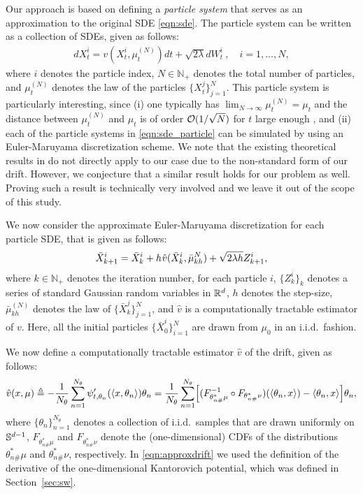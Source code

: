 Our approach is based on defining a \emph{particle system} that serves as an approximation to the original SDE \eqref{eqn:sde}. The particle system can be written as a collection of SDEs, given as follows:
\begin{align}
d X_t^i = v(X_t^i, \mu_t^{(N)}) dt + \sqrt{2 \lambda } d W_t^i \> , \quad i = 1,\dots, N, \label{eqn:sde_particle}
\end{align}
where $i$ denotes the particle index, $N \in \mathbb{N}_+$ denotes the total number of particles, and $\mu_t^{(N)}$ denotes the law of the particles $\{X_t^j\}_{j=1}^N$. This particle system is particularly interesting, since (i) one typically has $\lim_{N \rightarrow \infty} \mu_t^{(N)}= \mu_t $ and the distance between $\mu_t^{(N)}$ and $\mu_t$ is of order ${\cal O}(1/\sqrt{N})$ for $t$ large enough \cite{malrieu03,cgm-08}, and (ii) each of the particle systems in \eqref{eqn:sde_particle} can be simulated by using an Euler-Maruyama discretization scheme. We note that the existing theoretical results in \cite{veretennikov2006ergodic,mishura2016existence} do not directly apply to our case due to the non-standard form of our drift. However, we conjecture that a similar result holds for our problem as well. Proving such a result is technically very involved and we leave it out of the scope of this study. %




We now consider the approximate Euler-Maruyama discretization for each particle SDE, that is given as follows:
\begin{align}
\bar{X}^i_{k+1} = \bar{X}^i_k + h \hspace{0.5pt} \hat{v}(\bar{X}^i_k, \bar{\mu}_{kh}^N ) + \sqrt{2 \lambda h} Z^i_{k+1},
\end{align}
where $k \in \mathbb{N}_+$ denotes the iteration number, for each particle $i$, $\{Z^i_k\}_{k}$ denotes a series of standard Gaussian random variables in $\mathbb{R}^d$, $h$ denotes the step-size, $\bar{\mu}_{kh}^{(N)}$ denotes the law of $\{\bar{X}_{k}^j\}_{j=1}^N$, and $\hat{v}$ is a computationally tractable estimator of $v$. Here, all the initial particles $\{\bar{X}_0^i\}_{i=1}^N$ are drawn from $\mu_0$ in an i.i.d.\ fashion.

We now define a computationally tractable estimator $\hat{v}$ of the drift, given as follows:
\begin{align}
\hat{v}(x,\mu) \triangleq - \frac1{N_\theta} \sum_{n=1}^{N_\theta} \psi_{t, \theta_n}'(\langle x , \theta_n \rangle ) \theta_n = \frac1{N_\theta} \sum_{n=1}^{N_\theta} \Bigl[ (F^{-1}_{\theta^*_{n\#}\mu} \circ F_{\theta^*_{n\#}\nu}) (\langle \theta_n, x\rangle) - \langle \theta_n, x\rangle \Bigr] \theta_n , \label{eqn:approxdrift}
\end{align}
where $\{\theta_n\}_{n=1}^{N_\theta}$ denotes a collection of i.i.d.\ samples that are drawn uniformly on $\mathbb{S}^{d-1}$, $F_{\theta^*_{n\#}\mu}$ and $F_{\theta^*_{n\#}\nu}$ denote the (one-dimensional) CDFs of the distributions $\theta^*_{n\#}\mu$ and $\theta^*_{n\#}\nu$, respectively. In \eqref{eqn:approxdrift} we used the definition of the derivative of the one-dimensional Kantorovich potential, which was defined in Section~\ref{sec:sw}. 


